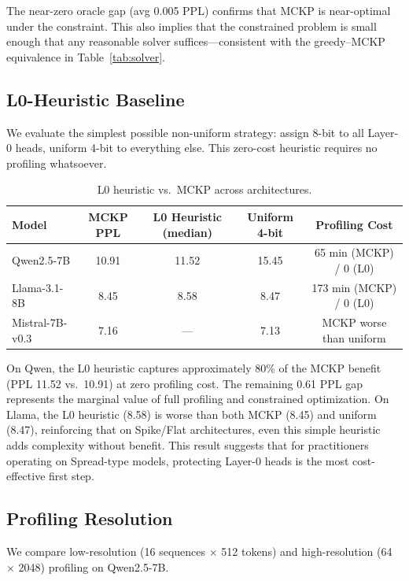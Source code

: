 \documentclass[11pt,a4paper]{article}
\begin{document}
The near-zero oracle gap (avg 0.005 PPL) confirms that MCKP is near-optimal under the constraint.
This also implies that the constrained problem is small enough that any reasonable solver suffices---consistent with the greedy--MCKP equivalence in Table~\ref{tab:solver}.

\subsection{L0-Heuristic Baseline}\label{sec:l0_heuristic}

We evaluate the simplest possible non-uniform strategy: assign 8-bit to all Layer-0 heads, uniform 4-bit to everything else.
This zero-cost heuristic requires no profiling whatsoever.

\begin{table}[h]
\centering
\caption{L0 heuristic vs.\ MCKP across architectures.}
\label{tab:l0_heuristic}
\small
\begin{tabular}{lcccc}
\toprule
Model & MCKP PPL & L0 Heuristic (median) & Uniform 4-bit & Profiling Cost \\
\midrule
Qwen2.5-7B & 10.91 & 11.52 & 15.45 & 65 min (MCKP) / 0 (L0) \\
Llama-3.1-8B & 8.45 & 8.58 & 8.47 & 173 min (MCKP) / 0 (L0) \\
Mistral-7B-v0.3 & 7.16 & --- & 7.13 & MCKP worse than uniform \\
\bottomrule
\end{tabular}
\end{table}

On Qwen, the L0 heuristic captures approximately 80\% of the MCKP benefit (PPL 11.52 vs.\ 10.91) at zero profiling cost.
The remaining 0.61 PPL gap represents the marginal value of full profiling and constrained optimization.
On Llama, the L0 heuristic (8.58) is worse than both MCKP (8.45) and uniform (8.47), reinforcing that on Spike/Flat architectures, even this simple heuristic adds complexity without benefit.
This result suggests that for practitioners operating on Spread-type models, protecting Layer-0 heads is the most cost-effective first step.

\subsection{Profiling Resolution}\label{sec:profiling}

We compare low-resolution (16 sequences $\times$ 512 tokens) and high-resolution (64 $\times$ 2048) profiling on Qwen2.5-7B.
\end{document}

